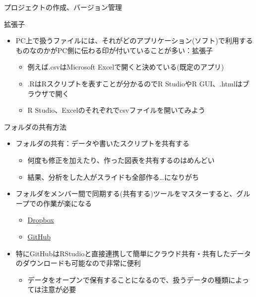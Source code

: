 \documentclass[
  ignorenonframetext,
]{beamer}
\providecommand{\tightlist}{%
  \setlength{\itemsep}{0pt}\setlength{\parskip}{0pt}}
\begin{document}
\begin{frame}[fragile]{プロジェクトの作成、バージョン管理}
\begin{block}{拡張子}
\protect\hypertarget{ux62e1ux5f35ux5b50}{}
\begin{itemize}
\tightlist
\item
  PC上で扱うファイルには、それがどのアプリケーション(ソフト)で利用するものなのかがPC側に伝わる印が付いていることが多い：拡張子

  \begin{itemize}
  \tightlist
  \item
    例えば.csvはMicrosoft Excelで開くと決めている(既定のアプリ)
  \item
    .RはRスクリプトを表すことが分かるのでR StudioやR
    GUI、.htmlはブラウザで開く
  \item
    R Studio、Excelのそれぞれでcsvファイルを開いてみよう
  \end{itemize}
\end{itemize}
\end{block}

\begin{block}{フォルダの共有方法}
\protect\hypertarget{ux30d5ux30a9ux30ebux30c0ux306eux5171ux6709ux65b9ux6cd5}{}
\begin{itemize}
\tightlist
\item
  フォルダの共有：データや書いたスクリプトを共有する

  \begin{itemize}
  \tightlist
  \item
    何度も修正を加えたり、作った図表を共有するのはめんどい
  \item
    結果、分析をした人がスライドも全部作る\ldots になりがち
  \end{itemize}
\item
  フォルダをメンバー間で同期する(共有する)ツールをマスターすると、グループでの作業が楽になる

  \begin{itemize}
  \tightlist
  \item
    \href{https://www.dropbox.com/}{Dropbox}
  \item
    \href{https://github.com/}{GitHub}
  \end{itemize}
\item
  特にGitHubはRStudioと直接連携して簡単にクラウド共有・共有したデータのダウンロードも可能なので非常に便利

  \begin{itemize}
  \tightlist
  \item
    データをオープンで保有することになるので、扱うデータの種類によっては注意が必要
  \end{itemize}
\end{itemize}
\end{block}


\end{frame}
\end{document}
